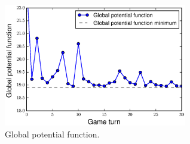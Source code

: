 \documentclass{sig-alternate-ipsn13}
\begin{document}
\begin{figure}
  \centering
  \includegraphics[width=80mm]{images/no_slider_global_potential_function}
  \caption{Global potential function.}
  \label{fig:global_potential_function}
\end{figure}













\end{document}
